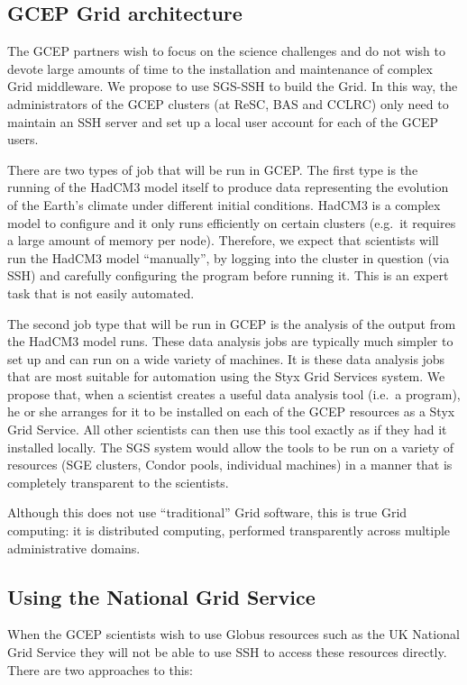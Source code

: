 \documentclass[a4paper]{article}
\begin{document}
\begin{multicols}{2}
\subsection{GCEP Grid architecture}

The GCEP partners wish to focus on the science challenges and do not wish to devote large amounts of time to the installation and maintenance of complex Grid middleware.  We propose to use SGS-SSH to build the Grid.  In this way, the administrators of the GCEP clusters (at ReSC, BAS and CCLRC) only need to maintain an SSH server and set up a local user account for each of the GCEP users.

There are two types of job that will be run in GCEP.  The first type is the running of the HadCM3 model itself to produce data representing the evolution of the Earth's climate under different initial conditions.  HadCM3 is a complex model to configure and it only runs efficiently on certain clusters (e.g.\ it requires a large amount of memory per node).  Therefore, we expect that scientists will run the HadCM3 model ``manually'', by logging into the cluster in question (via SSH) and carefully configuring the program before running it.  This is an expert task that is not easily automated.

The second job type that will be run in GCEP is the analysis of the output from the HadCM3 model runs.  These data analysis jobs are typically much simpler to set up and can run on a wide variety of machines.  It is these data analysis jobs that are most suitable for automation using the Styx Grid Services system.  We propose that, when a scientist creates a useful data analysis tool (i.e.\ a program), he or she arranges for it to be installed on each of the GCEP resources as a Styx Grid Service.  All other scientists can then use this tool exactly as if they had it installed locally.  The SGS system would allow the tools to be run on a variety of resources (SGE clusters, Condor pools, individual machines) in a manner that is completely transparent to the scientists.

Although this does not use ``traditional'' Grid software, this is true Grid computing: it is distributed computing, performed transparently across multiple administrative domains.

\subsection{Using the National Grid Service}
When the GCEP scientists wish to use Globus resources such as the UK National Grid Service they will not be able to use SSH to access these resources directly.  There are two approaches to this:


\end{multicols}
\end{document}
